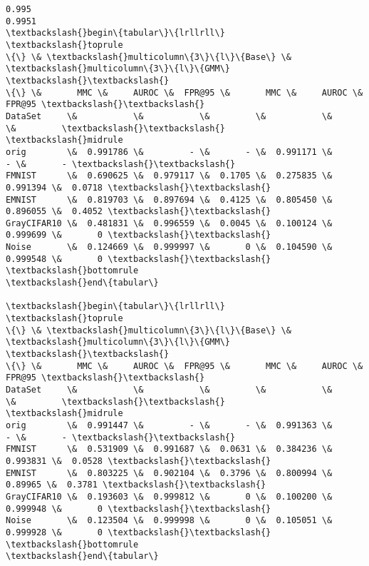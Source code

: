 \documentclass[11pt]{article}
\begin{document}
    \begin{Verbatim}[commandchars=\\\{\}]
0.995
0.9951
\textbackslash{}begin\{tabular\}\{lrllrll\}
\textbackslash{}toprule
\{\} \& \textbackslash{}multicolumn\{3\}\{l\}\{Base\} \& \textbackslash{}multicolumn\{3\}\{l\}\{GMM\} \textbackslash{}\textbackslash{}
\{\} \&       MMC \&     AUROC \&  FPR@95 \&       MMC \&     AUROC \&  FPR@95 \textbackslash{}\textbackslash{}
DataSet     \&           \&           \&         \&           \&           \&         \textbackslash{}\textbackslash{}
\textbackslash{}midrule
orig        \&  0.991786 \&         - \&       - \&  0.991171 \&         - \&       - \textbackslash{}\textbackslash{}
FMNIST      \&  0.690625 \&  0.979117 \&  0.1705 \&  0.275835 \&  0.991394 \&  0.0718 \textbackslash{}\textbackslash{}
EMNIST      \&  0.819703 \&  0.897694 \&  0.4125 \&  0.805450 \&  0.896055 \&  0.4052 \textbackslash{}\textbackslash{}
GrayCIFAR10 \&  0.481831 \&  0.996559 \&  0.0045 \&  0.100124 \&  0.999699 \&       0 \textbackslash{}\textbackslash{}
Noise       \&  0.124669 \&  0.999997 \&       0 \&  0.104590 \&  0.999548 \&       0 \textbackslash{}\textbackslash{}
\textbackslash{}bottomrule
\textbackslash{}end\{tabular\}

\textbackslash{}begin\{tabular\}\{lrllrll\}
\textbackslash{}toprule
\{\} \& \textbackslash{}multicolumn\{3\}\{l\}\{Base\} \& \textbackslash{}multicolumn\{3\}\{l\}\{GMM\} \textbackslash{}\textbackslash{}
\{\} \&       MMC \&     AUROC \&  FPR@95 \&       MMC \&     AUROC \&  FPR@95 \textbackslash{}\textbackslash{}
DataSet     \&           \&           \&         \&           \&           \&         \textbackslash{}\textbackslash{}
\textbackslash{}midrule
orig        \&  0.991447 \&         - \&       - \&  0.991363 \&         - \&       - \textbackslash{}\textbackslash{}
FMNIST      \&  0.531909 \&  0.991687 \&  0.0631 \&  0.384236 \&  0.993831 \&  0.0528 \textbackslash{}\textbackslash{}
EMNIST      \&  0.803225 \&  0.902104 \&  0.3796 \&  0.800994 \&   0.89965 \&  0.3781 \textbackslash{}\textbackslash{}
GrayCIFAR10 \&  0.193603 \&  0.999812 \&       0 \&  0.100200 \&  0.999948 \&       0 \textbackslash{}\textbackslash{}
Noise       \&  0.123504 \&  0.999998 \&       0 \&  0.105051 \&  0.999928 \&       0 \textbackslash{}\textbackslash{}
\textbackslash{}bottomrule
\textbackslash{}end\{tabular\}


    \end{Verbatim}
\end{document}
